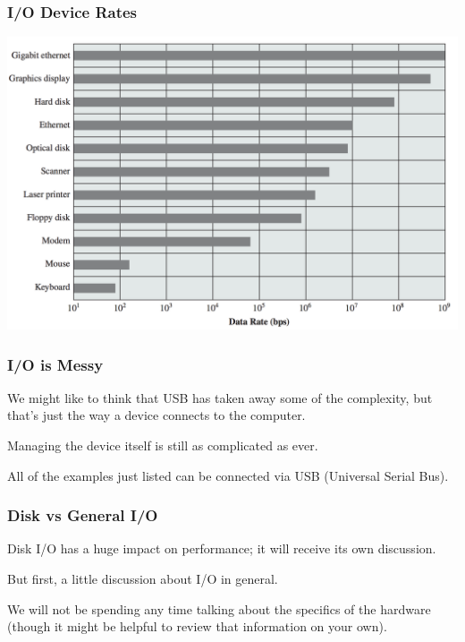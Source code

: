 \begin{frame}
\frametitle{I/O Device Rates}

\begin{center}
	\includegraphics[width=\textwidth]{images/io-device-rates.png}
\end{center}


\end{frame}

\begin{frame}
\frametitle{I/O is Messy}

We might like to think that USB has taken away some of the complexity, but that's just the way a device connects to the computer. 

Managing the device itself is still as complicated as ever. 

All of the examples just listed can be connected via USB (Universal Serial Bus). 


\end{frame}

\begin{frame}
\frametitle{Disk vs General I/O}

Disk I/O has a huge impact on performance; it will receive its own discussion. 

But first, a little discussion about I/O in general.

We will not be spending any time talking about the specifics of the hardware (though it might be helpful to review that information on your own). 

\end{frame}

